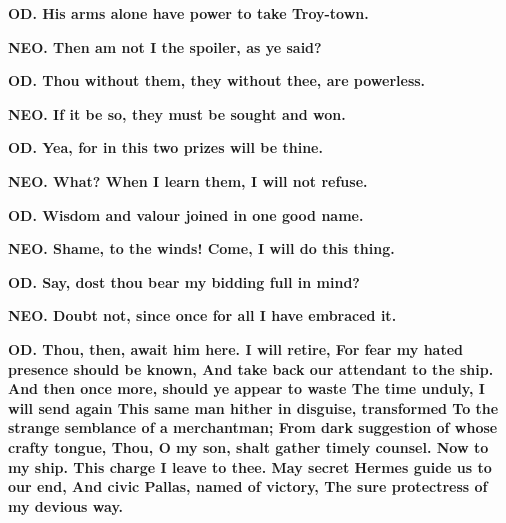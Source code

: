 \documentclass[11pt,letter]{book}
\begin{document}
\par \textbf{OD. His arms alone have power to take Troy-town.}
\par 

\par \textbf{NEO. Then am not I the spoiler, as ye said?}
\par 

\par \textbf{OD. Thou without them, they without thee, are powerless.}
\par 

\par \textbf{NEO. If it be so, they must be sought and won.}
\par 

\par \textbf{OD. Yea, for in this two prizes will be thine.}
\par 

\par \textbf{NEO. What? When I learn them, I will not refuse.}
\par 

\par \textbf{OD. Wisdom and valour joined in one good name.}
\par 

\par \textbf{NEO. Shame, to the winds! Come, I will do this thing.}
\par 

\par \textbf{OD. Say, dost thou bear my bidding full in mind?}
\par 

\par \textbf{NEO. Doubt not, since once for all I have embraced it.}
\par 

\par \textbf{OD. Thou, then, await him here. I will retire, For fear my hated presence should be known, And take back our attendant to the ship. And then once more, should ye appear to waste The time unduly, I will send again This same man hither in disguise, transformed To the strange semblance of a merchantman; From dark suggestion of whose crafty tongue, Thou, O my son, shalt gather timely counsel. Now to my ship. This charge I leave to thee. May secret Hermes guide us to our end, And civic Pallas, named of victory, The sure protectress of my devious way.}
\par 
\end{document}
